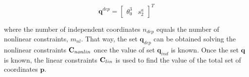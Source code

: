 \begin{equation} 
{{\mathbf{q}}^{dep}} = {\left[ {\begin{array}{*{20}{c}}
{{\theta_{0}^{3}}}&{s_2^a}
\end{array}} \right]^T}
\label{Dep}
\end{equation}

where the number of independent coordinates $n_{dep}$ equals the number of nonlinear constraints, $m_{nl}$. That way, the set $\textbf{q}_{dep}$ can be obtained solving the nonlinear constraints ${\bf{C}}_{nonlin}$ once the value of set $\textbf{q}_{ind}$ is known. Once the set $\textbf{q}$ is known, the linear constraints ${\bf{C}}_{lin}$ is used to find the value of the total set of coordinates $\textbf{p}$.







